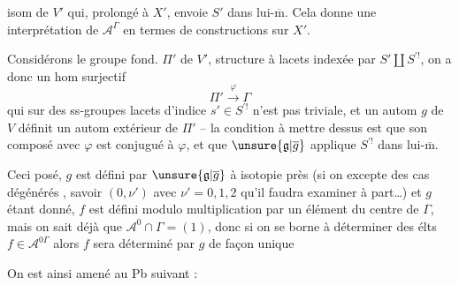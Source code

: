 
isom de $V'$ qui, prolongé à $X'$, envoie $S'$ dans lui-$\overline{\mathrm m}$. Cela donne une interprétation de $\mathcal A^\Gamma$ en termes de constructions sur $X'$.

Considérons le groupe fond. $\Pi'$ de $V'$,  structure à lacets indexée par $S'\amalg S^{\prime!}$, on a donc un hom surjectif
\[
\Pi'\xrightarrow{\varphi}\Gamma
\]
qui sur  des ss-groupes  lacets d'indice $s'\in S^{\prime!}$ n'est pas triviale, et un autom $g$ de $V$ définit un autom extérieur  de $\Pi'$ -- la condition à mettre dessus est que son composé avec $\varphi$ est conjugué à $\varphi$, et que $\unsure{\mathfrak g|\overline g}$ applique $S^{\prime!}$ dans lui-$\overline{\mathrm m}$.


Ceci posé,  $g$ est défini par $\unsure{\mathfrak g|\overline g}$ à isotopie près  (si on excepte des cas  dégénérés , savoir $(0,\nu')$ avec $\nu'=0,1,2$ qu'il faudra examiner à part\ldots) et $g$ étant donné, $f$ est défini modulo multiplication par un élément du centre de $\Gamma$, mais on sait déjà que $\mathcal A^0\cap\Gamma=(1)$, donc si on se borne à déterminer des élts $f\in\mathcal A^{0\Gamma}$ alors $f$ sera déterminé par $g$ de façon unique


On est ainsi amené au Pb suivant :

